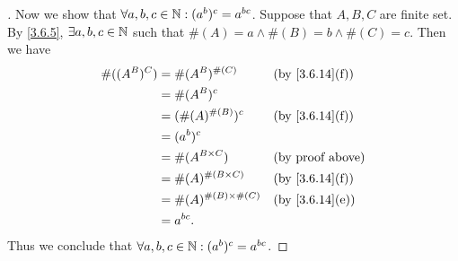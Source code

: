 \begin{proof}[]
	Now we show that \(\forall a, b, c \in \mathbb{N} : (a^b)^c = a^{bc}\).
	Suppose that \(A, B, C\) are finite set.
	By \cref{3.6.5}, \(\exists a, b, c \in \mathbb{N}\) such that \(\#(A) = a \land \#(B) = b \land \#(C) = c\).
	Then we have
	\begin{align*}
		\#((A^B)^C) & = \#(A^B)^{\#(C)}            &  & \text{(by \cref{3.6.14}(f))} \\
		            & = \#(A^B)^c                                                    \\
		            & = (\#(A)^{\#(B)})^c          &  & \text{(by \cref{3.6.14}(f))} \\
		            & = (a^b)^c                                                      \\
		            & = \#(A^{B \times C})         &  & \text{(by proof above)}      \\
		            & = \#(A)^{\#(B \times C)}     &  & \text{(by \cref{3.6.14}(f))} \\
		            & = \#(A)^{\#(B) \times \#(C)} &  & \text{(by \cref{3.6.14}(e))} \\
		            & = a^{bc}.
	\end{align*}
	Thus we conclude that \(\forall a, b, c \in \mathbb{N} : (a^b)^c = a^{bc}\).


\end{proof}

